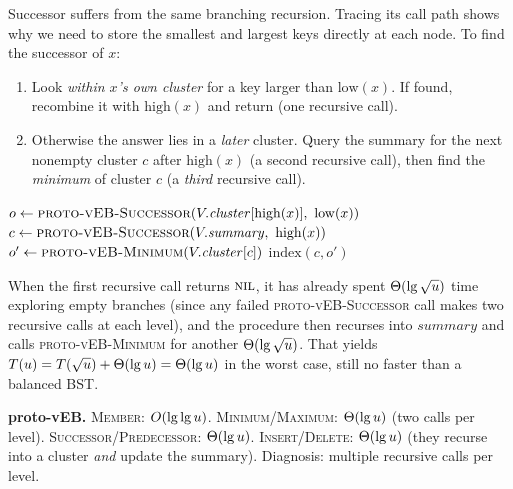Successor suffers from the same branching recursion. Tracing its call
path shows why we need to store the smallest and largest keys directly at each node. To find
the successor of $x$:

\begin{enumerate}
  \item Look \emph{within $x$'s own cluster} for a key larger than
        $\mathrm{low}(x)$. If found, recombine it with $\mathrm{high}(x)$ and
        return (one recursive call).
  \item Otherwise the answer lies in a \emph{later} cluster. Query the summary for
        the next nonempty cluster $c$ after $\mathrm{high}(x)$ (a second recursive
        call), then find the \emph{minimum} of cluster $c$ (a \emph{third}
        recursive call).
\end{enumerate}

\begin{algorithm}[H]
\caption{\textsc{proto-vEB-Successor}($V, x$)}
$o \leftarrow \textsc{proto-vEB-Successor}(V.\mathit{cluster}[\mathrm{high}(x)],\ \mathrm{low}(x))$\;
$c \leftarrow \textsc{proto-vEB-Successor}(V.\mathit{summary},\ \mathrm{high}(x))$\;
$o' \leftarrow \textsc{proto-vEB-Minimum}(V.\mathit{cluster}[c])$\;
\Return $\mathrm{index}(c, o')$\;
\end{algorithm}

When the first recursive call returns $\textsc{nil}$, it has already spent $\Theta(\lg\sqrt{u})$ time exploring empty branches (since any failed \textsc{proto-vEB-Successor} call makes two recursive calls at each level), and the procedure then recurses into $\mathit{summary}$ and calls \textsc{proto-vEB-Minimum} for another $\Theta(\lg\sqrt{u})$. That yields $T(u) = T(\sqrt{u}) + \Theta(\lg u) = \Theta(\lg u)$ in the worst case, still no faster than a balanced BST.

\begin{complexitybox}
\textbf{proto-vEB.}
\textsc{Member}: $O(\lg\lg u)$.
\textsc{Minimum}/\textsc{Maximum}: $\Theta(\lg u)$ (two calls per level).
\textsc{Successor}/\textsc{Predecessor}: $\Theta(\lg u)$.
\textsc{Insert}/\textsc{Delete}: $\Theta(\lg u)$ (they recurse
into a cluster \emph{and} update the summary).
Diagnosis: multiple recursive calls per level.
\end{complexitybox}


